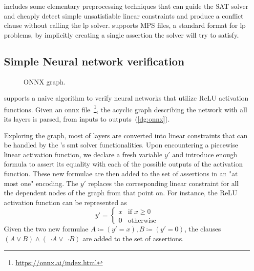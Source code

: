\documentclass[runningheads]{llncs}
\begin{document}
\dlinear includes some elementary preprocessing techniques that can guide the SAT solver and cheaply detect simple unsatisfiable linear constraints and produce a conflict clause without calling the \gls{lp} solver.
\dlinear supports MPS files, a standard format for \gls{lp} problems, by implicitly creating a single assertion the solver will try to satisfy.

\subsection{Simple Neural network verification}
\label{sec:nn-verification}

\begin{figure}
    \captionsetup{font=small}
    \vspace{-2.3cm}
    \resizebox{1.04\linewidth}{!}{%
        
    }
    \caption{ONNX graph.}
    \label{dg:onnx}
\end{figure}

\dlinear supports a naive algorithm to verify neural networks that utilize ReLU activation functions.
Given an \gls{onnx} file~\footnote{\url{https://onnx.ai/index.html}}, the acyclic graph describing the network with all its layers is parsed, from inputs to outputs~(\autoref{dg:onnx}).

Exploring the graph, most of layers are converted into linear constraints that can be handled by the \dlinear's \gls{smt} solver functionalities.
Upon encountering a piecewise linear activation function, we declare a fresh variable $y'$ and introduce enough formula to assert its equality with each of the possible outputs of the activation function.
These new formulae are then added to the set of assertions in an "at most one" encoding.
The $y'$ replaces the corresponding linear constraint for all the dependent nodes of the graph from that point on.
For instance, the ReLU activation function can be represented as
\begin{equation*}
    y' = \begin{cases}
        x & \text{if } x \ge 0 \\
        0 & \text{otherwise}
    \end{cases}
\end{equation*}
Given the two new formulae $A \coloneqq (y' = x), B \coloneqq (y' = 0)$, the clauses $(A \lor B) \land (\neg A \lor \neg B)$ are added to the set of assertions.
\end{document}
